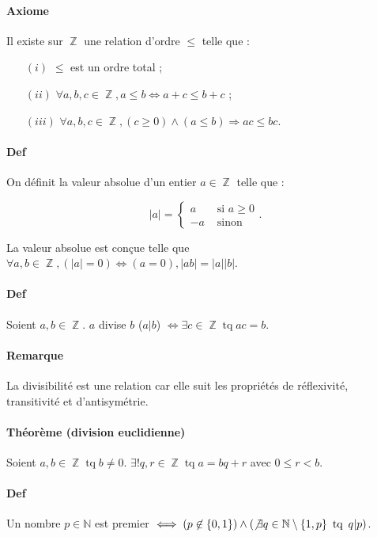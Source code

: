 \documentclass{article}
\DeclareMathOperator{\tq}{\text{ tq }}
\DeclareMathOperator{\Z}{\mathbb Z}
\begin{document}
			\paragraph{Axiome} Il existe sur $\Z$ une relation d'ordre $\leq$ telle que :

			\begin{itemize}
				\item[$(i)$] $\leq$ est un ordre total ;
				\item[$(ii)$] $\forall a, b, c \in \Z, a \leq b \iff a + c \leq b + c$ ;
				\item[$(iii)$] $\forall a, b, c \in \Z, (c \geq 0) \land (a \leq b) \Rightarrow ac \leq bc$.
			\end{itemize}

			\paragraph{Def} On définit la valeur absolue d'un entier $a \in \Z$ telle que :

			\[|a| = \left\{\begin{aligned}a &\text{ si $a \geq 0$} \\-a &\text{ sinon}\end{aligned}\right..\]

			La valeur absolue est conçue telle que $\forall a, b \in \Z, (|a| = 0) \iff (a = 0), |ab| = |a||b|$.

			\paragraph{Def} Soient $a, b \in \Z$. $a$ divise $b$ ($a|b$) $\iff \exists c \in \Z \tq ac = b$.

			\paragraph{Remarque} La divisibilité est une relation car elle suit les propriétés de réflexivité, transitivité et d'antisymétrie.

			\paragraph{Théorème (division euclidienne)} Soient $a, b \in \Z \tq b \neq 0$. $\exists! q, r \in \Z \tq a = bq + r$
			avec $0 \leq r < b$.

			\paragraph{Def} Un nombre $p \in \mathbb N$ est premier $\iff (p \not \in \{0, 1\}) \land (\not \exists q \in \mathbb N \setminus \{1, p\}
			\tq q|p)$.
\end{document}
